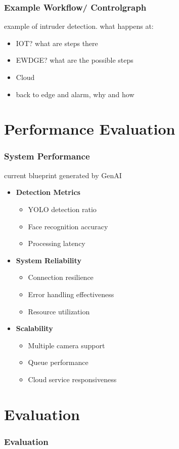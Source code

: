 \documentclass{beamer}
\begin{document}
\begin{frame}
    \frametitle{Example Workflow/ Controlgraph}
    example of intruder detection. what happens at: 
    \begin{itemize}
        \item IOT? what are steps there
        \item EWDGE? what are the possible steps
        \item Cloud
        \item back to edge and alarm, why and how
    \end{itemize}
\end{frame}


\section{Performance Evaluation}
\begin{frame}
\frametitle{System Performance}
current blueprint generated by GenAI
    \begin{itemize}
    \item \textbf{Detection Metrics}
    \begin{itemize}
    \item YOLO detection ratio
    \item Face recognition accuracy
    \item Processing latency
    \end{itemize}
    \item \textbf{System Reliability}
    \begin{itemize}
    \item Connection resilience
    \item Error handling effectiveness
    \item Resource utilization
    \end{itemize}
    \item \textbf{Scalability}
    \begin{itemize}
    \item Multiple camera support
    \item Queue performance
    \item Cloud service responsiveness
    \end{itemize}
    \end{itemize}
\end{frame}

\section{Evaluation}

\begin{frame}
\frametitle{Evaluation}
\end{frame}



\end{document}
